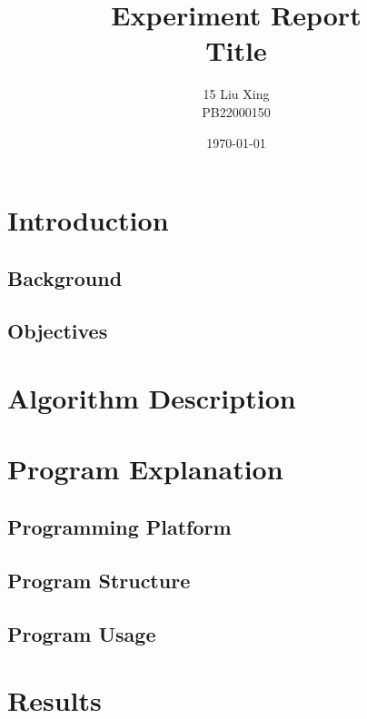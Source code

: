 \documentclass[12pt,a4paper]{report}
\title{
    \vspace{3cm}
    \textbf{Experiment Report}\\[0.5cm]
    \Large Title\\[0.5cm] %
    \vspace{2cm}
}
\author{15 Liu Xing \\ PB22000150}
\date{\today}
\begin{document}
\maketitle
\tableofcontents
\newpage

\chapter{Introduction}
    \section{Background}

    \section{Objectives}

\chapter{Algorithm Description}

\chapter{Program Explanation}
    \section{Programming Platform}

    \section{Program Structure}

    \section{Program Usage}

\chapter{Results}
\end{document}
